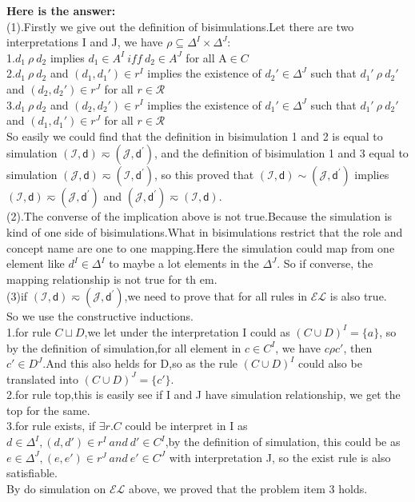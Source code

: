 \documentclass{article}
\begin{document}
    \textbf{Here is the answer:}\\
    (1).Firstly we give out the definition of bisimulations.Let there are two interpretations I and J, we have $\rho \subseteq \Delta^I \times \Delta^J$:\\
    1.$d_1\ \rho\ d_2$ implies $d_1 \in A^I\ iff\ d_2 \in A^J$ for all A$\in C$\\
    2.$d_1\ \rho\ d_2$ and $(d_1,d_1')\in r^I$ implies the existence of $d_2'\in \Delta^J$ such that $d_1'\ \rho\ d_2'$ and $(d_2,d_2')\in r^J$ for all $r\in \mathcal{R}$\\
    3.$d_1\ \rho\ d_2$ and $(d_2,d_2')\in r^I$ implies the existence of $d_1'\in \Delta^J$ such that $d_1'\ \rho\ d_2'$ and $(d_1,d_1')\in r^J$ for all $r\in \mathcal{R}$\\
    So easily we could find that the definition in bisimulation 1 and 2 is equal to simulation $(\mathcal{I},\textsf{d})\eqsim(\mathcal{J},\textsf{d}^{\prime})$, and the definition of bisimulation 1 and 3 equal to simulation $(\mathcal{J},\textsf{d})\eqsim(\mathcal{I},\textsf{d}^{\prime})$, so this proved that
    $(\mathcal{I},\textsf{d})\sim(\mathcal{J},\textsf{d}^{\prime})$ implies $(\mathcal{I},\textsf{d})\eqsim(\mathcal{J},\textsf{d}^{\prime})$ and $(\mathcal{J},\textsf{d}^{\prime})\eqsim(\mathcal{I},\textsf{d})$.\\

    (2).The converse of the implication above is not true.Because the simulation is kind of one side of bisimulations.What in bisimulations restrict that the role and concept name are one to one mapping.Here the simulation could map from one element like $d^I\in \Delta^I$ to maybe a lot elements in the $\Delta^J$.
    So if converse, the mapping relationship is not true for th  em.\\

    (3)if $(\mathcal{I},\textsf{d})\eqsim(\mathcal{J},\textsf{d}^{\prime})$,we need to prove that for all rules in  $\mathcal{EL}$ is also true.\\
    So we use the constructive inductions.\\
    1.for rule $C\sqcup D$,we let under the interpretation I could as $(C\cup D)^I = \{a\}$, so by the definition of simulation,for all element in $c\in C^I$, we have $c \rho c'$, then $c'\in D^J$.And this also helds for D,so as the rule $(C \cup D)^I$ could also be translated into $(C\cup D)^J = \{c'\}$.\\
    2.for rule top,this is easily see if I and J have simulation relationship, we get the top for the same.\\
    3.for rule exists, if $\exists r.C$ could be interpret in I as $d\in \Delta^I,(d,d')\in r^I\ and\ d' \in C^I$,by the definition of simulation, this could be as
    $e\in \Delta^J,(e,e')\in r^J\ and\ e' \in C^J$ with interpretation J, so the exist rule is also satisfiable.\\
    By do simulation on $\mathcal{EL}$ above, we proved that the problem item 3 holds.\\
\end{document}
